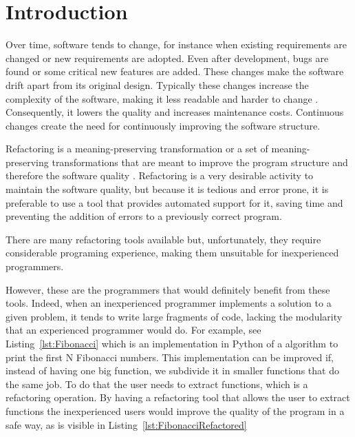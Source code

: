 
% 
% 


\section{Introduction}
\label{sec:Introduction}

Over time, software tends to change, for instance when existing requirements are changed or new requirements are adopted. 
Even after development, bugs are found or some critical new features are added.
These changes make the software drift apart from its original design.
Typically these changes increase the complexity of the software, making it less readable and harder to change \cite{mens2003refactoring}. 
Consequently, it lowers the quality and increases maintenance costs.
Continuous changes create the need for continuously improving the software structure.

Refactoring is a meaning-preserving transformation or a set of meaning-preserving transformations that are meant to improve the program structure and therefore the software quality \cite{bourquin2007high}.
Refactoring is a very desirable activity to maintain the software quality, but because it is tedious and error prone, it is preferable to use a tool that provides automated support for it, saving time and preventing the addition of errors to a previously correct program.

%
There are many refactoring tools available but, unfortunately, they require considerable programing experience, making them unsuitable for inexperienced programmers.

However, these are the programmers that would definitely benefit from these tools.
Indeed, when an inexperienced programmer implements a solution to a given problem, it tends to write large fragments of code, lacking the modularity that an experienced programmer would do.
For example, see Listing~\ref{lst:Fibonacci} which is an implementation in Python of a algorithm to print the first N Fibonacci numbers.
This implementation can be improved if, instead of having one big function, we subdivide it in smaller functions that do the same job.
To do that the user needs to extract functions, which is a refactoring operation.
By having a refactoring tool that allows the user to extract functions the inexperienced users would improve the quality of the program in a safe way, as is visible in Listing~\ref{lst:FibonacciRefactored}



